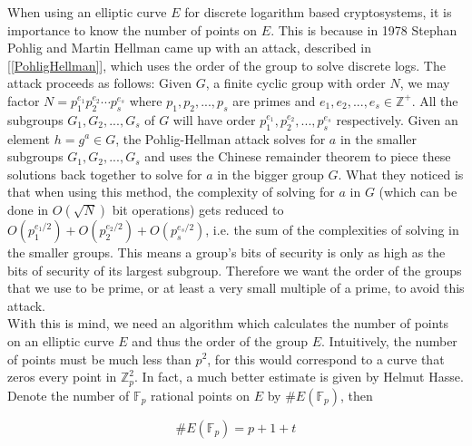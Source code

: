 When using an elliptic curve $E$ for discrete logarithm based cryptosystems, it is importance to know the number of points on $E$. This is because in 1978 Stephan Pohlig and Martin Hellman came up with an attack, described in [\ref{PohligHellman}], which uses the order of the group to solve discrete logs. The attack proceeds as follows: Given $G$, a finite cyclic group with order $N$, we may factor $N = p_1^{e_1}p_2^{e_2} \cdots p_s^{e_s}$ where $p_1,p_2,...,p_s$ are primes and $e_1,e_2,...,e_s \in \mathbb{Z}^+ $. All the subgroups $G_1,G_2,...,G_s$ of $G$ will have order $p_1^{e_1},p_2^{e_2},...,p_s^{e_s}$ respectively. Given an element $h = g^a \in G$, the Pohlig-Hellman attack solves for $a$ in the smaller subgroups $G_1,G_2,...,G_s$ and uses the Chinese remainder theorem to piece these solutions back together to solve for $a$ in the bigger group $G$. What they noticed is that when using this method, the complexity of solving for $a$ in $G$ (which can be done in $O(\sqrt{N})$ bit operations) gets reduced to $O(p_1^{e_1/2}) + O(p_2^{e_2/2}) + O(p_s^{e_s/2})$, i.e. the sum of the complexities of solving in the smaller groups. This means a group's bits of security is only as high as the bits of security of its largest subgroup. Therefore we want the order of the groups that we use to be prime, or at least a very small multiple of a prime, to avoid this attack. \\

With this is mind, we need an algorithm which calculates the number of points on an elliptic curve $E$ and thus the order of the group $E$. Intuitively, the number of points must be much less than $p^2$, for this would correspond to a curve that zeros every point in $\mathbb{Z}_p^2$. In fact, a much better estimate is given by Helmut Hasse. Denote the number of $\mathbb{F}_p$ rational points on $E$ by $\# E(\mathbb{F}_p)$, then  

\begin{equation}
	\# E(\mathbb{F}_p) = p + 1 + t
\end{equation}

